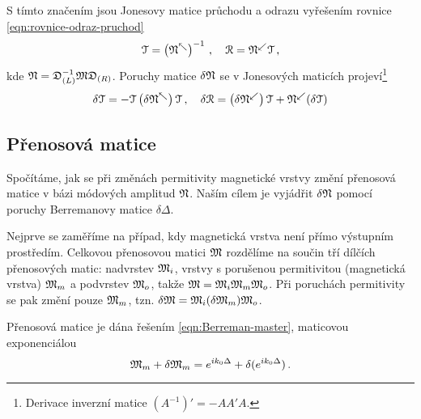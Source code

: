 S tímto značením jsou Jonesovy matice průchodu a odrazu vyřešením rovnice \eqref{eqn:rovnice-odraz-pruchod}
\begin{equation}
    \mathcal{T} = \left(\mathfrak{N}^\nwarrow\right)^{-1} \,, \quad \mathcal{R}=\mathfrak{N}^\swarrow \mathcal{T} \,,
\end{equation}
kde $\mathfrak{N} = \mathfrak{D}_{(L)}^{-1} \mathfrak{M} \mathfrak{D}_{(R)}$.
Poruchy matice $\delta\mathfrak{N}$ se v Jonesových maticích projeví\footnote{Derivace inverzní matice $(A^{-1})'=-AA'A$.}
\begin{equation}
    \label{eqn:app-derivace-RT}
    \delta\mathcal{T} = -\mathcal{T} \left(\delta\mathfrak{N}^\nwarrow \right) \mathcal{T} \,, \quad \delta\mathcal{R}=\left(\delta\mathfrak{N}^\swarrow\right) \mathcal{T} + \mathfrak{N}^\swarrow (\delta\mathcal{T})
\end{equation}


\subsection*{Přenosová matice}

Spočítáme, jak se při změnách permitivity magnetické vrstvy změní přenosová matice v bázi módových amplitud $\mathfrak{N}$.
Naším cílem je vyjádřit $\delta\mathfrak{N}$ pomocí poruchy Berremanovy matice $\delta\Delta$.

Nejprve se zaměříme na případ, kdy magnetická vrstva není přímo výstupním prostředím.
Celkovou přenosovou matici $\mathfrak{M}$ rozdělíme na součin tří dílčích přenosových matic: nadvrstev $\mathfrak{M}_i$, vrstvy s porušenou permitivitou (magnetická vrstva) $\mathfrak{M}_m$ a podvrstev $\mathfrak{M}_o$, takže $\mathfrak{M} = \mathfrak{M}_i \mathfrak{M}_m \mathfrak{M}_o$.
Při poruchách permitivity se pak změní pouze $\mathfrak{M}_m$, tzn. $\delta\mathfrak{M} = \mathfrak{M}_i (\delta\mathfrak{M}_m) \mathfrak{M}_o$.

Přenosová matice je dána řešením \eqref{eqn:Berreman-master}, maticovou exponenciálou
\begin{equation}
    \mathfrak{M}_m + \delta \mathfrak{M}_m = e^{ik_0\Delta}+\delta(e^{ik_0\Delta}) \,.
\end{equation}

